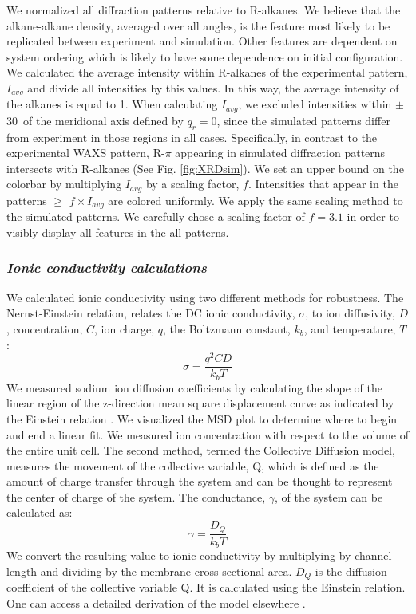 \documentclass[journal=jpcbfk,manusciprt=article]{achemso}
\begin{document}
  We normalized all diffraction patterns relative to R-alkanes. We believe that the
  alkane-alkane density, averaged over all angles, is the feature most likely to be
  replicated between experiment and simulation. Other features are dependent on 
  system ordering which is likely to have some dependence on initial configuration. 
  We calculated the average intensity within R-alkanes of the experimental pattern,
  $I_{avg}$ and divide all intensities by this values. In this way, the average intensity
  of the alkanes is equal to 1. When calculating $I_{avg}$, we excluded intensities 
  within $\pm$ 30\degree~of the meridional axis defined by $q_r=0$, since the simulated
  patterns differ from experiment in those regions in all cases. Specifically, in contrast
  to the experimental WAXS pattern, R-$\pi$ appearing in simulated diffraction patterns 
  intersects with R-alkanes (See Fig. \ref{fig:XRDsim}). We set
  an upper bound on the colorbar by multiplying $I_{avg}$ by a scaling factor, $f$. 
  Intensities that appear in the patterns $\geq$ $f\times I_{avg}$ are colored uniformly. 
  We apply the same scaling method to the simulated patterns. We carefully chose a scaling
  factor of $f=3.1$ in order to visibly display all features in the all patterns.

  \subsubsection{\textit{Ionic conductivity calculations}}

  We calculated ionic conductivity using two different methods for robustness.
  The Nernst-Einstein relation, relates the DC ionic conductivity, $\sigma$, to ion
  diffusivity, $D$, concentration, $C$, ion charge, $q$, the Boltzmann constant,
  $k_b$, and temperature, $T$: 
  \begin{equation}
	\sigma = \dfrac{q^2CD}{k_b T} 
	\label{eqn:nernst_einstein}
  \end{equation}
  We measured sodium ion diffusion coefficients by calculating the slope
  of the linear region of the z-direction mean square displacement curve as
  indicated by the Einstein relation \cite{einstein_investigations_1956}. We
  visualized the MSD plot to determine where to begin and end a linear fit. We
  measured ion concentration with respect to the volume of the entire unit cell. 
  The second method, termed the Collective Diffusion model, measures the
  movement of the collective variable, Q, which is defined as the amount of
  charge transfer through the system and can be thought to represent the center
  of charge of the system. The conductance, $\gamma$, of the system can be
  calculated as:
  \begin{equation}
	 \gamma = \dfrac{D_Q}{k_b T} 
	\label{eqn:collective_diffusion}
  \end{equation}
  We convert the resulting value to ionic conductivity by multiplying by
  channel length and dividing by the membrane cross sectional area. $D_Q$ is the
  diffusion coefficient of the collective variable Q. It is calculated using the
  Einstein relation. One can access a detailed derivation of the model elsewhere
  \cite{liu_collective_2013}.
  
\end{document}
